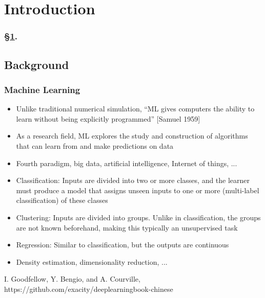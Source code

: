 
\section{Introduction}\label{sec:intro}


\frameinlbffalse

\begin{frame}[plain]
\frametitle{\S\ref{sec:intro}. \insertsection}
\listofframes
\end{frame}
\addtocounter{framenumber}{-1} %

\frameinlbftrue

\subsection{Background}

\begin{frame}
  \MyLogo
  \frametitle{Machine Learning}  
\small
\smallskip

\begin{itemize}

\item Unlike traditional numerical simulation, ``ML gives computers the ability to learn without being explicitly programmed'' {\footnotesize\color{DarkOrchid}[Samuel 1959]}

\item As a research field, ML explores the study and construction of algorithms that can \alert{learn} from and \alert{make predictions} on \alert{data}

\item Fourth paradigm, big data, artificial intelligence, Internet of things, ...

\end{itemize}


\begin{itemize}

\item Classification: Inputs are divided into two or more classes, and the learner must produce a model that assigns unseen inputs to one or more (multi-label classification) of these classes

\item Clustering: Inputs are divided into groups. Unlike in classification, the groups are not known beforehand, making this typically an unsupervised task

\item Regression: Similar to classification, but the outputs are continuous

\item Density estimation, dimensionality reduction, ...

\end{itemize}

\begin{center}
{\color{red} \scriptsize
I. Goodfellow, Y. Bengio, and A. Courville,
https://github.com/exacity/deeplearningbook-chinese
}
\end{center}
\end{frame}

